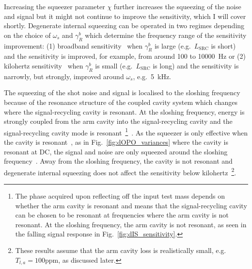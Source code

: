 Increasing the squeezer parameter $\chi$ further increases the squeezing of the noise and signal but it might not continue to improve the sensitivity, which I will cover shortly. 
Degenerate internal squeezing can be operated in two regimes depending on the choice of $\omega_s$ and $\gamma^b_R$ which determine the frequency range of the sensitivity improvement: (1) broadband sensitivity~\cite{korobkoQuantumExpanderGravitationalwave2019} when $\gamma^b_R$ is large (e.g.\ $L_\text{SRC}$ is short) and the sensitivity is improved, for example, from around 100 to 10000~Hz or (2) kilohertz sensitivity~\cite{adyaQuantumEnhancedKHz2020} when $\gamma^b_R$ is small (e.g.\ $L_\text{SRC}$ is long) and the sensitivity is narrowly, but strongly, improved  around $\omega_s$, e.g.\ 5~kHz.

The squeezing of the shot noise and signal is localised to the sloshing frequency because of the resonance structure of the coupled cavity system which changes where the signal-recycling cavity is resonant. At the sloshing frequency, energy is strongly coupled from the arm cavity into the signal-recycling cavity and the signal-recycling cavity mode is resonant~\footnote{The phase acquired upon reflecting off the input test mass depends on whether the arm cavity is resonant and means that the signal-recycling cavity can be chosen to be resonant at frequencies where the arm cavity is not resonant. At the sloshing frequency, the arm cavity is not resonant, as seen in the falling signal response in Fig.~\ref{fig:dIS_sensitivity}.}~\cite{korobkoTamingQuantumNoiseHow2020}. As the squeezer is only effective when the cavity is resonant~\cite{}, as in Fig.~\ref{fig:dOPO_variances} where the cavity is resonant at DC, the signal and noise are only squeezed around the sloshing frequency~\cite{}.  Away from the sloshing frequency, the cavity is not resonant and degenerate internal squeezing does not affect the sensitivity below kilohertz~\footnote{These results assume that the arm cavity loss is realistically small, e.g.\ $T_{l,a}=100\text{ppm}$, as discussed later.}.

